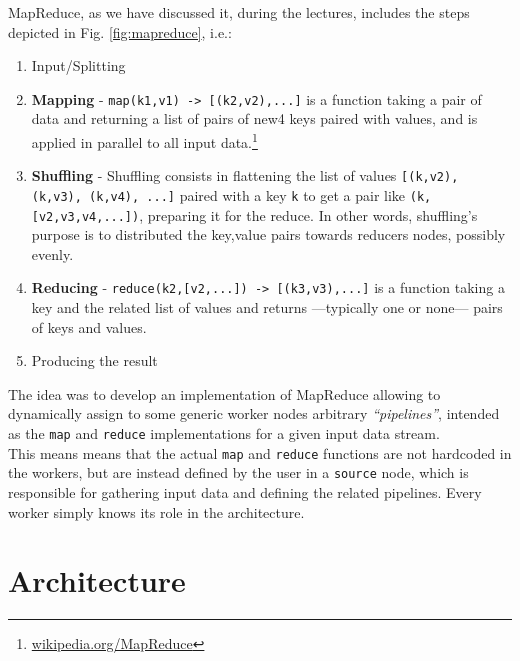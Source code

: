 {MapReduce, as we have discussed it, during the lectures, includes the steps depicted in Fig. \ref{fig:mapreduce}, i.e.:\ns
\begin{enumerate}
   \item Input/Splitting
   \item \textbf{Mapping} - \lstinline{map(k1,v1) -> [(k2,v2),...]} is a function taking a pair of data and returning a list of pairs of new4 keys paired with values, and is applied in parallel to all input data.\footnote{\href{https://en.wikipedia.org/wiki/MapReduce}{wikipedia.org/MapReduce}}
   \item \textbf{Shuffling} - Shuffling consists in flattening the list of values \lstinline{[(k,v2), (k,v3), (k,v4), ...]} paired with a key \texttt{k} to get a pair like \lstinline|(k,[v2,v3,v4,...])|, preparing it for the reduce. In other words, shuffling's purpose is to distributed the key,value pairs towards reducers nodes, possibly evenly. 
   \item \textbf{Reducing} - \lstinline|reduce(k2,[v2,...]) -> [(k3,v3),...]| is a function taking a key and the related list of values and returns ---typically one or none--- pairs of keys and values. 
   \item Producing the result
\end{enumerate}}

The idea was to develop an implementation of MapReduce allowing to dynamically assign to some generic worker nodes arbitrary \textit{``pipelines''}, intended as the \lstinline|map| and \lstinline|reduce| implementations for a given input data stream.\\
This means means that the actual \lstinline|map| and \lstinline|reduce| functions are not hardcoded in the workers, but are instead defined by the user in a \texttt{source} node, which is responsible for gathering input data and defining the related pipelines.
Every worker simply knows its role in the architecture.

\section{Architecture}

